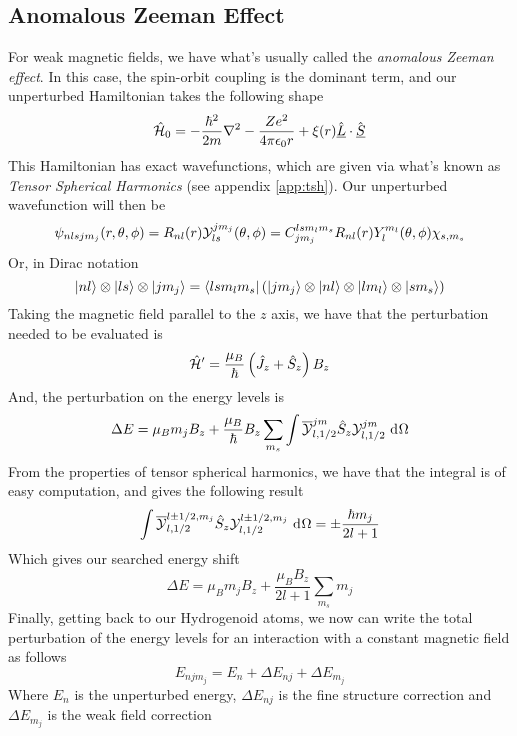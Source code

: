 \documentclass[../qm.tex]{subfiles}
\begin{document}
	\subsection{Anomalous Zeeman Effect}
	For weak magnetic fields, we have what's usually called the \textit{anomalous Zeeman effect}. In this case, the spin-orbit coupling is the dominant term, and our unperturbed Hamiltonian takes the following shape
	\begin{equation}
		\hat{\mathcal{H}}_0=-\frac{\hbar^2}{2m}\nabla^2-\frac{Ze^2}{4\pi\epsilon_0r}+\xi(r)\hat{\underline{L}}\cdot\hat{\underline{S}}
		\label{eq:spinorbitham}
	\end{equation}
	This Hamiltonian has exact wavefunctions, which are given via what's known as \textit{Tensor Spherical Harmonics} (see appendix \ref{app:tsh}). Our unperturbed wavefunction will then be
	\begin{equation}
		\psi_{nlsjm_j}(r,\theta,\phi)=R_{nl}(r)\mathcal{Y}^{jm_j}_{ls}(\theta,\phi)=C_{jm_j}^{lsm_lm_s}R_{nl}(r)Y^{m_l}_l(\theta,\phi)\chi_{s,m_s}
		\label{eq:wavefunctionspinorbit}
	\end{equation}
	Or, in Dirac notation
	\begin{equation}
		\ket{nl}\otimes\ket{ls}\otimes\ket{jm_j}=\bra{lsm_lm_s}\left(\ket{jm_j}\otimes\ket{nl}\otimes\ket{lm_l}\otimes\ket{sm_s}\right)
		\label{eq:spinorbitautoket}
	\end{equation}
	Taking the magnetic field parallel to the $z$ axis, we have that the perturbation needed to be evaluated is
	\begin{equation}
		\hat{\mathcal{H}}'=\frac{\mu_B}{\hbar}\left( \hat{J}_z+\hat{S}_z \right)B_z
		\label{eq:perturbationweakfield}
	\end{equation}
	And, the perturbation on the energy levels is
	\begin{equation}
		\Delta E=\mu_Bm_jB_z+\frac{\mu_B}{\hbar}B_z\sum_{m_s}\int\overline{\mathcal{Y}}^{jm}_{l,1/2}\hat{S}_z\mathcal{Y}^{jm}_{l,1/2}\ \mathrm{d}^{}\Omega
		\label{eq:energyshiftweakfield}
	\end{equation}
	From the properties of tensor spherical harmonics, we have that the integral is of easy computation, and gives the following result
	\begin{equation}
		\int\overline{\mathcal{Y}}^{l\pm1/2,m_j}_{l,1/2}\hat{S}_z\mathcal{Y}^{l\pm1/2,m_j}_{l,1/2}\ \mathrm{d}^{}\Omega=\pm\frac{\hbar m_j}{2l+1}
		\label{eq:integralcomputationweakf}
	\end{equation}
	Which gives our searched energy shift
	\begin{equation}
		\Delta E=\mu_Bm_jB_z+\frac{\mu_BB_z}{2l+1}\sum_{m_s}m_j
		\label{eq:anomalouszeemanshift}
	\end{equation}
	Finally, getting back to our Hydrogenoid atoms, we now can write the total perturbation of the energy levels for an interaction with a constant magnetic field as follows
	\begin{equation}
		E_{njm_j}=E_n+\Delta E_{nj}+\Delta E_{m_j}
		\label{eq:totalperthyatoms}
	\end{equation}
	Where $E_n$ is the unperturbed energy, $\Delta E_{nj}$ is the fine structure correction and $\Delta E_{m_j}$ is the weak field correction
\end{document}
